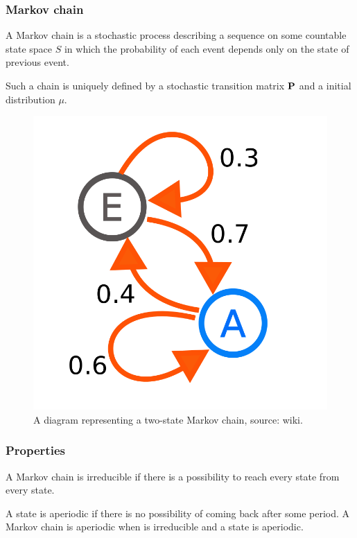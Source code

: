\begin{frame}
	\frametitle{Markov chain}
	\begin{definition}
		A Markov chain is a stochastic process describing a sequence on some countable state space $S$ in which the probability of each event depends only on the state of previous event.
	\end{definition}
	\begin{definition}
		 Such a chain is uniquely defined by a stochastic transition matrix $\mathbf{P}$ and a initial distribution $\mu$.
	\end{definition}
	\begin{figure}[!htb]
		\includegraphics[scale=0.085]{img/Markov_diagram.png}
		\caption{A diagram representing a two-state Markov chain, source: wiki.}
	\end{figure}
\end{frame}

\begin{frame}
	\frametitle{Properties}
	\begin{definition}[Irreducibility]
		A Markov chain is irreducible if there is a possibility to reach every state from every state.
	\end{definition}

	\begin{definition}[Aperiodicity]
		A state is aperiodic if there is no possibility of coming back after some period. A Markov chain is aperiodic when is irreducible and a state is aperiodic.
	\end{definition}
	
\end{frame}

